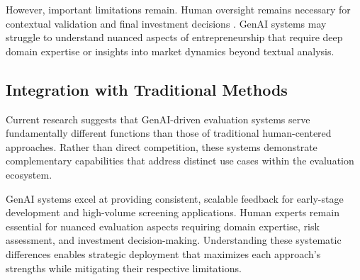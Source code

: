 However, important limitations remain. Human oversight remains necessary for contextual validation and final investment decisions \cite{Steyvers2024}. GenAI systems may struggle to understand nuanced aspects of entrepreneurship that require deep domain expertise or insights into market dynamics beyond textual analysis.

\subsection{Integration with Traditional Methods}\label{subsec:integration-with-traditional-methods}
Current research suggests that GenAI-driven evaluation systems serve fundamentally different functions than those of traditional human-centered approaches. Rather than direct competition, these systems demonstrate complementary capabilities that address distinct use cases within the evaluation ecosystem.

GenAI systems excel at providing consistent, scalable feedback for early-stage development and high-volume screening applications. Human experts remain essential for nuanced evaluation aspects requiring domain expertise, risk assessment, and investment decision-making. Understanding these systematic differences enables strategic deployment that maximizes each approach's strengths while mitigating their respective limitations.


